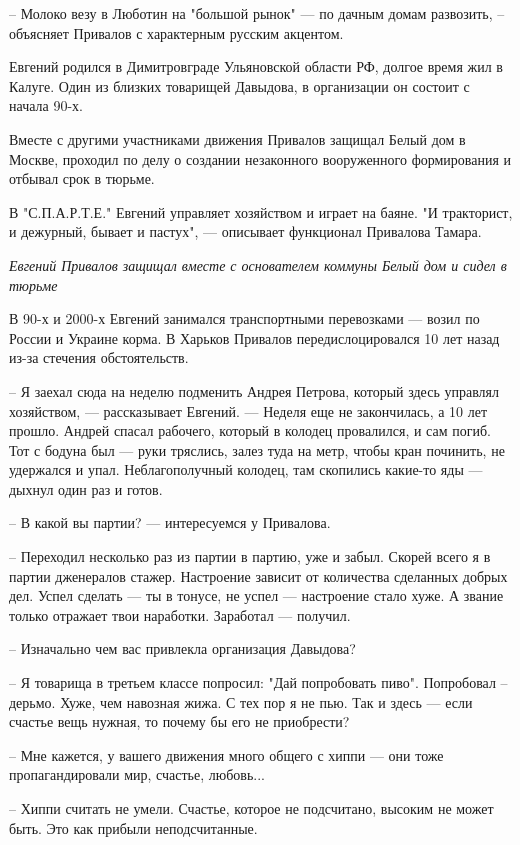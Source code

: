 – Молоко везу в Люботин на "большой рынок" --- по дачным домам развозить, –
объясняет Привалов с характерным русским акцентом.

Евгений родился в Димитровграде Ульяновской области РФ, долгое время жил в
Калуге. Один из близких товарищей Давыдова, в организации он состоит с начала
90-х. 

Вместе с другими участниками движения Привалов защищал Белый дом в Москве,
проходил по делу о создании незаконного вооруженного формирования и отбывал
срок в тюрьме.

В "С.П.А.Р.Т.Е." Евгений управляет хозяйством и играет на баяне. "И тракторист,
и дежурный, бывает и пастух", --- описывает функционал Привалова Тамара.

\emph{Евгений Привалов защищал вместе с основателем коммуны Белый дом и сидел в
тюрьме}

В 90-х и 2000-х Евгений занимался транспортными перевозками --- возил по России и
Украине корма. В Харьков Привалов передислоцировался 10 лет назад из-за
стечения обстоятельств.

– Я заехал сюда на неделю подменить Андрея Петрова, который здесь управлял
хозяйством, --- рассказывает Евгений. --- Неделя еще не закончилась, а 10 лет
прошло. Андрей спасал рабочего, который в колодец провалился, и сам погиб. Тот
с бодуна был --- руки тряслись, залез туда на метр, чтобы кран починить, не
удержался и упал. Неблагополучный колодец, там скопились какие-то яды --- дыхнул
один раз и готов.

– В какой вы партии? --- интересуемся у Привалова.

– Переходил несколько раз из партии в партию, уже и забыл. Скорей всего я в
партии дженералов стажер. Настроение зависит от количества сделанных добрых
дел. Успел сделать --- ты в тонусе, не успел --- настроение стало хуже. А звание
только отражает твои наработки. Заработал --- получил.

– Изначально чем вас привлекла организация Давыдова?

– Я товарища в третьем классе попросил: "Дай попробовать пиво". Попробовал –
дерьмо. Хуже, чем навозная жижа. С тех пор я не пью. Так и здесь --- если счастье
вещь нужная, то почему бы его не приобрести? 

– Мне кажется, у вашего движения много общего с хиппи --- они тоже
пропагандировали мир, счастье, любовь...

– Хиппи считать не умели. Счастье, которое не подсчитано, высоким не может
быть. Это как прибыли неподсчитанные. 


